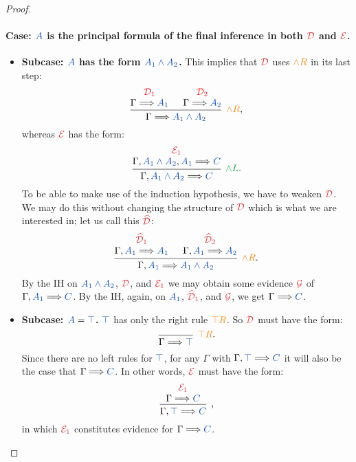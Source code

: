 \begin{proof}
  \paragraph{Case: $\prp{A}$ is the principal formula of the final inference
  in both $\drv{D}$ and $\drv{E}$.}
  \begin{itemize}
    \item \textbf{Subcase: $\prp{A}$ has the form $\prp{A_1 \land A_2}$.}
    This implies that $\drv{D}$ uses $\rightRule{\land R}$ in its last step:
    \[
      \begin{prooftree}
        \hypo{{\color{Red} \mathcal{D}_1}}
        \infer[no rule]1{\sequent{A_1}}
        \hypo{{\color{Red} \mathcal{D}_2}}
        \infer[no rule]1{\sequent{A_2}}
        \infer2[$\rightRule{\land R}$,]{\sequent{A_1 \land A_2}}
      \end{prooftree}
    \]
    whereas $\drv{E}$ has the form:
    \[
      \begin{prooftree}
        \hypo{{\color{Red} \mathcal{E}_1}}
        \infer[no rule]1{\sequent[A_1 \land A_2][A_1]{C}}
        \infer1[$\leftRule{\land L}$.]{\sequent[A_1 \land A_2]{C}}
      \end{prooftree}
    \]
    To be able to make use of the induction hypothesis, we have to weaken
    $\drv{D}$. We may do this without changing the structure of $\drv{D}$ which
    is what we are interested in; let us call this $\drv{\widehat{D}}$:
    \[
      \begin{prooftree}
        \hypo{\drv{\widehat{D}}[1]}
        \infer[no rule]1{\sequent[A_1]{A_1}}
        \hypo{\drv{\widehat{D}}[2]}
        \infer[no rule]1{\sequent[A_1]{A_2}}
        \infer2[$\rightRule{\land R}$.]{\sequent[A_1]{A_1 \land A_2}}
      \end{prooftree}
    \]
    By the IH on $\prp{A_1 \land A_2}$, $\drv{D}$, and
    ${\color{Red} \mathcal{E}_1}$ we may obtain some evidence $\drv{G}$
    of $\sequent[A_1]{C}$. By the IH, again, on $\prp{A_1}$,
    $\drv{\widehat{D}}[1]$, and $\drv{G}$, we get $\sequent{C}$.
    \item \textbf{Subcase: $\prp{A} = \prp{\top}$.}
    $\prp{\top}$ has only the right rule $\rightRule{\top R}$. So $\drv{D}$
    must have the form:
    \[
      \begin{prooftree}
        \infer0[$\rightRule{\top R}$.]{\sequent{\top}}
      \end{prooftree}
    \]
    Since there are no left rules for $\prp{\top}$, for any $\Gamma$ with
    $\sequent[\top]{C}$ it will also be the case that $\sequent{C}$. In
    other words, $\drv{E}$ must have the form:
    \[
      \begin{prooftree}
        \hypo{\drv{E}[1]}
        \infer[no rule]1{\sequent{C}}
        \infer1[,]{\sequent[\top]{C}}
      \end{prooftree}
    \]
    in which $\drv{E}[1]$ constitutes evidence for $\sequent{C}$.


\end{itemize}
\end{proof}
